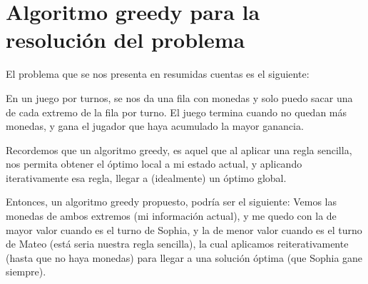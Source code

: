 \section{Algoritmo greedy para la resolución del problema}

El problema que se nos presenta en resumidas cuentas es el siguiente:

En un juego por turnos, se nos da una fila con monedas y solo puedo sacar una de cada extremo de la fila por turno. El juego termina cuando no quedan más monedas, y gana el jugador que haya acumulado la mayor ganancia.

Recordemos que un algoritmo greedy, es aquel que al aplicar una regla sencilla, nos permita obtener el óptimo local a mi estado actual, y aplicando iterativamente esa regla, llegar a (idealmente) un óptimo global.

Entonces, un algoritmo greedy propuesto, podría ser el siguiente: Vemos las monedas de ambos extremos (mi información actual), y me quedo con la de mayor valor cuando es el turno de Sophia, y la de menor valor cuando es el turno de Mateo (está seria nuestra regla sencilla), la cual aplicamos reiterativamente (hasta que no haya monedas) para llegar a una solución óptima (que Sophia gane siempre).